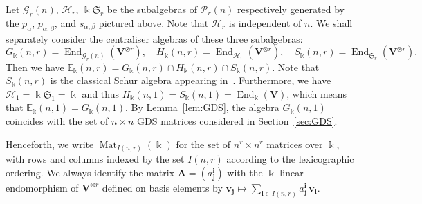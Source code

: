 \documentclass[10pt]{article}
\theoremstyle{definition}
\DeclareMathOperator{\End}{End}
\DeclareMathOperator{\Mat}{Mat}
\newcommand{\E}{\mathbb{E}}
\newcommand{\Sym}{\mathfrak{S}}
\newcommand{\GG}{\mathcal{G}}
\newcommand{\HH}{\mathcal{H}}
\newcommand{\Ptn}{\mathcal{P}}
\newcommand{\bi}{{\boldsymbol{i}}} %
\newcommand{\bj}{{\boldsymbol{j}}}
\newcommand{\bA}{\mathbf{A}}
\newcommand{\V}{\mathbf{V}} %
\newcommand{\bv}{\mathbf{v}} %
\begin{document}
Let $\GG_r(n)$, $\HH_r$, $\Bbbk\Sym_r$ be the subalgebras of
$\Ptn_r(n)$ respectively generated by the $p_\alpha$,
$p_{\alpha,\beta}$, and $s_{\alpha,\beta}$ pictured above. Note that
$\HH_r$ is independent of $n$. We shall separately consider the
centraliser algebras of these three subalgebras:
\[
G_\Bbbk(n,r) = \End_{\GG_r(n)}(\V^{\otimes r}), \quad
H_\Bbbk(n,r) = \End_{\HH_r} (\V^{\otimes r}), \quad %
S_\Bbbk(n,r) = \End_{\Sym_r} (\V^{\otimes r}).
\]
Then we have $\E_\Bbbk(n,r) = G_\Bbbk(n,r) \cap H_\Bbbk(n,r) \cap
S_\Bbbk(n,r)$. Note that $S_\Bbbk(n,r)$ is the classical Schur algebra
appearing in~\cite{Green:book}. Furthermore, we have
$\HH_1=\Bbbk\Sym_1=\Bbbk$ and thus
$H_\Bbbk(n,1)=S_\Bbbk(n,1)=\End_\Bbbk(\V)$, which means that
$\E_\Bbbk(n,1) = G_\Bbbk(n,1)$. By Lemma~\ref{lem:GDS}, the algebra
$G_\Bbbk(n,1)$ coincides with the set of $n \times n$ GDS matrices
considered in Section~\ref{sec:GDS}.

Henceforth, we write $\Mat_{I(n,r)}(\Bbbk)$ for the set of $n^r \times
n^r$ matrices over $\Bbbk$, with rows and columns indexed by the set
$I(n,r)$ according to the lexicographic ordering. We always identify
the matrix $\bA = (a^\bi_\bj)$ with the $\Bbbk$-linear endomorphism of
$\V^{\otimes r}$ defined on basis elements by $\bv_\bj \mapsto
\sum_{\bi \in I(n,r)} a^{\bi}_{\bj} \, \bv_{\bi}$.
\end{document}
